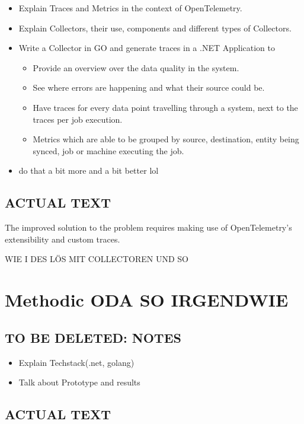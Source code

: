 \begin{itemize}
	\item Explain Traces and Metrics in the context of OpenTelemetry.
	\item Explain Collectors, their use, components and different types of Collectors.
	\item Write a Collector in GO and generate traces in a .NET Application to
	      \begin{itemize}
		      \item Provide an overview over the data quality in the system.
		      \item See where errors are happening and what their source could be.
		      \item Have traces for every data point travelling through a system, next to the traces per job execution.
		      \item Metrics which are able to be grouped by source, destination, entity being synced, job or machine executing the job.
	      \end{itemize}
	\item do that a bit more and a bit better lol
\end{itemize}

\subsection{ACTUAL TEXT}

The improved solution to the problem requires making use of OpenTelemetry's extensibility and custom traces.

WIE I DES LÖS MIT COLLECTOREN UND SO

\section{Methodic ODA SO IRGENDWIE}

\subsection{TO BE DELETED: NOTES}

\begin{itemize}
	\item Explain Techstack(.net, golang)
	\item Talk about Prototype and results
\end{itemize}

\subsection{ACTUAL TEXT}

